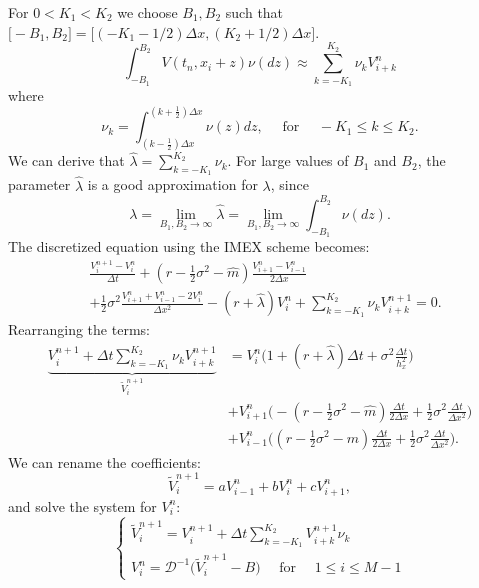 For $0 < K_1 < K_2$ we choose $B_1,B_2$ such that $ \bigl[-B_1,B_2\bigr] = \bigl[ ( -K_1-1/2 )\Delta x , ( K_2+1/2 )\Delta x \bigr] $.
\begin{equation}\label{trap_quad}
 \int_{-B_1}^{B_2}  V(t_n,x_i+z) \nu(dz) \approx \sum_{k = -K_1}^{K_2} \nu_k V^{n}_{i+k}
\end{equation}
where
\begin{equation}\label{nu1}
 \nu_k = \int_{(k-\frac{1}{2}) \Delta x}^{(k+\frac{1}{2}) \Delta x} \nu(z) dz, \hspace{1em} \mbox{ for } \hspace{1em} -K_1 \leq k \leq K_2. 
\end{equation}
We can derive that $ \hat \lambda = \sum_{k = -K_1}^{K_2} \nu_k $. For large values of $B_1$ and $B_2$, the parameter $\hat \lambda$ is a good approximation for $\lambda$, since
$$\lambda = \lim_{B_1,B_2 \to \infty} \hat \lambda = \lim_{B_1,B_2 \to \infty} \int_{-B_1}^{B_2} \nu(dz).$$
The discretized equation using the IMEX scheme becomes: 
\begin{align}
&\frac{V^{n+1}_{i} -V^{n}_{i}}{\Delta t} + 
(r-\frac{1}{2}\sigma^2 - \hat m) \frac{V^{n}_{i+1} -V^{n}_{i-1}}{ 2 \Delta x} \\ \nonumber
&+ \frac{1}{2} \sigma^2 \frac{V^{n}_{i+1} + V^{n}_{i-1} - 2 V^{n}_{i}}{\Delta x^2}  - (r+\hat \lambda) V^{n}_i +\sum_{k = -K_1}^{K_2} \nu_k V^{n+1}_{i+k} = 0.
\end{align}
Rearranging the terms: 
\begin{align*}
\underbrace{ V^{n+1}_{i} + \Delta t \sum_{k = -K_1}^{K_2} \nu_k V^{n+1}_{i+k} }_{\tilde V^{n+1}_i} &= 
	V^{n}_{i} \biggl( 1 + (r+\hat \lambda)\Delta t + \sigma^2 \frac{\Delta t}{h_x^2} \biggr)  \\
& + V^{n}_{i+1} \biggl( -(r -\frac{1}{2}\sigma^2 -\hat m )\frac{\Delta t}{2 \Delta x} +
\frac{1}{2}\sigma^2 \frac{\Delta t}{\Delta x^2}  \biggr)  \\
& + V^{n}_{i-1} \biggl( (r -\frac{1}{2}\sigma^2 - \hat m)\frac{\Delta t}{2 \Delta x} + 
\frac{1}{2}\sigma^2 \frac{\Delta t}{\Delta x^2}  \biggr).
\end{align*}
We can rename the coefficients:
$$ \tilde V^{n+1}_{i} = a V^{n}_{i-1} + b V^{n}_{i} + c V^{n}_{i+1}, $$
and solve the system for $V^{n}_{i}$:
\begin{equation*}
 \begin{cases}
  \tilde V^{n+1}_i = V^{n+1}_{i} + \Delta t \sum_{k = -K_1}^{K_2} V^{n+1}_{i+k} \nu_k \\
  V^{n}_{i} = \mathcal{D}^{-1} \biggl( \tilde V^{n+1}_{i} - B \biggr) \quad \mbox{ for } \quad 1 \leq i \leq M-1  
 \end{cases}
\end{equation*}

